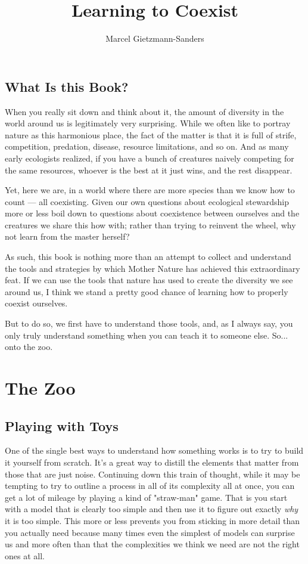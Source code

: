 \documentclass[11pt,a5paper]{book}
\title{Learning to Coexist}
\author{Marcel Gietzmann-Sanders}
\date{}
\begin{document}
\maketitle
\tableofcontents
\newpage
\chapter{What Is this Book?}

When you really sit down and think about it, the amount of diversity in the world around us is legitimately very surprising. While we often like to portray nature as this harmonious place, the fact of the matter is that it is full of strife, competition, predation, disease, resource limitations, and so on. And as many early ecologists realized, if you have a bunch of creatures naively competing for the same resources, whoever is the best at it just wins, and the rest disappear.

Yet, here we are, in a world where there are more species than we know how to count — all coexisting. Given our own questions about ecological stewardship more or less boil down to questions about coexistence between ourselves and the creatures we share this how with; rather than trying to reinvent the wheel, why not learn from the master herself? \newline

As such, this book is nothing more than an attempt to collect and understand the tools and strategies by which Mother Nature has achieved this extraordinary feat. If we can use the tools that nature has used to create the diversity we see around us, I think we stand a pretty good chance of learning how to properly coexist ourselves.

But to do so, we first have to understand those tools, and, as I always say, you only truly understand something when you can teach it to someone else. So... onto the zoo. 

\part{The Zoo}

\chapter{Playing with Toys}

One of the single best ways to understand how something works is to try to build it yourself from scratch. It's a great way to distill the elements that matter from those that are just noise. Continuing down this train of thought, while it may be tempting to try to outline a process in all of its complexity all at once, you can get a lot of mileage by playing a kind of "straw-man" game. That is you start with a model that is clearly too simple and then use it to figure out exactly \textit{why} it is too simple. This more or less prevents you from sticking in more detail than you actually need because many times even the simplest of models can surprise us and more often than that the complexities we think we need are not the right ones at all. 
\newline
\end{document}
